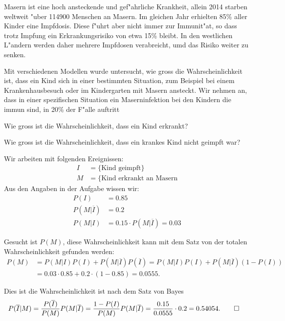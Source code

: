Masern ist eine hoch ansteckende und gef"ahrliche Krankheit,
allein 2014 starben weltweit "uber 114900 Menschen an Masern.
Im gleichen Jahr erhielten 85\% aller Kinder eine Impfdosis.
Diese f"uhrt aber nicht immer zur Immunit"at, so dass trotz Impfung
ein Erkrankungsrisiko von etwa 15\% bleibt.
In den westlichen L"andern werden daher mehrere Impfdosen verabreicht,
umd das Risiko weiter zu senken.

Mit verschiedenen Modellen wurde untersucht, wie gross die Wahrscheinlichkeit
ist, dass ein Kind sich in einer bestimmten Situation, zum Beispiel
bei einem Krankenhausbesuch oder im Kindergarten mit Masern ansteckt.
Wir nehmen an, dass in einer spezifischen Situation ein Maserninfektion
bei den Kindern die immun sind, in 20\% der F"alle auftritt

\begin{teilaufgaben}
\item
Wie gross ist die Wahrscheinlichkeit, dass ein Kind erkrankt?
\item
Wie gross ist die Wahrscheinlichkeit, dass ein krankes Kind nicht
geimpft war?
\end{teilaufgaben}

\begin{loesung}
Wir arbeiten mit folgenden Ereignissen:
\begin{align*}
I&=\{\text{Kind geimpft}\}\\
M&=\{\text{Kind erkrankt an Masern}
\end{align*}
Aus den Angaben in der Aufgabe wissen wir:
\begin{align*}
P(I)&=0.85\\
P(M|\overline I)&=0.2\\
P(M|I)&=0.15 \cdot P(M|\overline I)= 0.03
\end{align*}
\begin{teilaufgaben}
\item
Gesucht ist $P(M)$, diese Wahrscheinlichkeit kann mit dem Satz von der
totalen Wahrscheinlichkeit gefunden werden:
\begin{align*}
P(M) 
&=
P(M|I)P(I) + P(M|\overline I)P(\overline I)
=
P(M|I)P(I) + P(M|\overline I)(1-P(I))
\\
&=
0.03\cdot 0.85 + 0.2\cdot(1-0.85)=0.0555.
\end{align*}
\item
Dies ist die Wahrscheinlichkeit  ist nach dem Satz von Bayes
\begin{align*}
P(\overline I|M)
&=
\frac{P(\overline I)}{P(M)}P(M|\overline I)
=
\frac{1-P(I)}{P(M)}P(M|\overline I)
=
\frac{0.15}{0.0555}\cdot 0.2
=
0.54054.
\qedhere
\end{align*}
\end{teilaufgaben}
\end{loesung}


